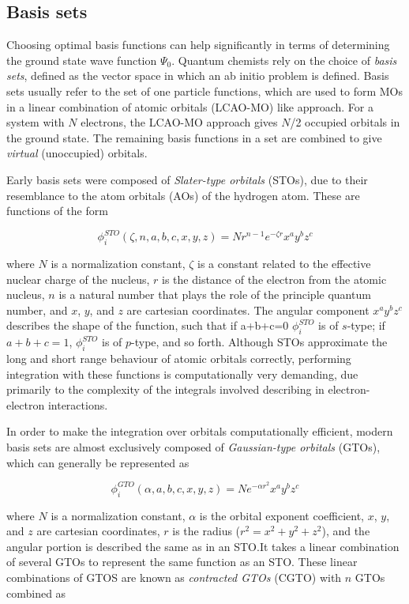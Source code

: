 \begin{doublespace}
\subsection{Basis sets}

Choosing optimal basis functions can help significantly in terms of determining
the ground state wave function $\Psi_0$. Quantum chemists rely on the choice of
\emph{basis sets}, defined as the vector space in which an ab initio problem is
defined. Basis sets usually refer to the set of one particle functions, which
are used to form MOs in a linear combination of atomic orbitals (LCAO-MO) like
approach. For a system with $N$ electrons, the LCAO-MO approach gives $N$/2
occupied orbitals in the ground state. The remaining basis functions in a set
are combined to give \emph{virtual} (unoccupied) orbitals.

Early basis sets were composed of \emph{Slater-type orbitals} (STOs), due to
their resemblance to the atom orbitals (AOs) of the hydrogen atom. These are
functions of the form

\begin{equation}
\phi_i^{STO}(\zeta,n,a,b,c,x,y,z) = Nr^{n-1}e^{-\zeta r}x^a y^b z^c
\end{equation}

\noindent where $N$ is a normalization constant, $\zeta$ is a constant related
to the effective nuclear charge of the nucleus, $r$ is the distance of the
electron from the atomic nucleus, $n$ is a natural number that plays the role
of the principle quantum number, and $x$, $y$, and $z$ are cartesian
coordinates. The angular component $x^a y^b z^c$ describes the shape of the
function, such that if a+b+c=0 $\phi_i^{STO}$ is of $s$-type; if $a+b+c=1$,
$\phi_i^{STO}$ is of $p$-type, and so forth. Although STOs approximate the long
and short range behaviour of atomic orbitals correctly, performing integration
with these functions is computationally very demanding, due primarily to the
complexity of the integrals involved describing in electron-electron
interactions.

In order to make the integration over orbitals computationally efficient,
modern basis sets are almost exclusively composed of \emph{Gaussian-type
orbitals} (GTOs), which can generally be represented as

\begin{equation}
\phi_i^{GTO}(\alpha,a,b,c,x,y,z) = N e^{-\alpha r^2} x^a y^b z^c
\end{equation}

\noindent where $N$ is a normalization constant, $\alpha$ is the orbital
exponent coefficient, $x$, $y$, and $z$ are cartesian coordinates, $r$ is the
radius ($r^2=x^2+y^2+z^2$), and the angular portion is described the same as in
an STO.\@ It takes a linear combination of several GTOs to represent the same
function as an STO. These linear combinations of GTOS are known as
\emph{contracted GTOs} (CGTO) with $n$ GTOs combined as


\end{doublespace}
